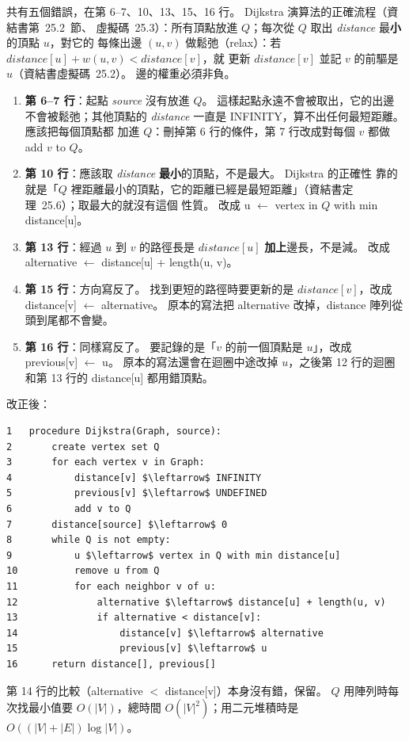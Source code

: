 \begin{pastsoln}
共有五個錯誤，在第 6--7、10、13、15、16 行。 Dijkstra 演算法的正確流程（資結書第~25.2~節、
虛擬碼~25.3）：所有頂點放進 $Q$；每次從 $Q$ 取出 \textit{distance} 最\textbf{小}的頂點 $u$，對它的
每條出邊 $(u, v)$ 做鬆弛（relax）：若 $\mathit{distance}[u] + w(u, v) < \mathit{distance}[v]$，就
更新 $\mathit{distance}[v]$ 並記 $v$ 的前驅是 $u$（資結書虛擬碼~25.2）。 邊的權重必須非負。

\begin{enumerate}
\item \textbf{第 6--7 行}：起點 \textit{source} 沒有放進 $Q$。 這樣起點永遠不會被取出，它的出邊
不會被鬆弛；其他頂點的 \textit{distance} 一直是 INFINITY，算不出任何最短距離。 應該把每個頂點都
加進 $Q$：刪掉第 6 行的條件，第 7 行改成對每個 $v$ 都做 add $v$ to $Q$。
\item \textbf{第 10 行}：應該取 \textit{distance} \textbf{最小}的頂點，不是最大。 Dijkstra 的正確性
靠的就是「$Q$ 裡距離最小的頂點，它的距離已經是最短距離」（資結書定理~25.6）；取最大的就沒有這個
性質。 改成 u $\leftarrow$ vertex in $Q$ with min distance[u]。
\item \textbf{第 13 行}：經過 $u$ 到 $v$ 的路徑長是 $\mathit{distance}[u]$ \textbf{加上}邊長，不是減。
改成 alternative $\leftarrow$ distance[u] + length(u, v)。
\item \textbf{第 15 行}：方向寫反了。 找到更短的路徑時要更新的是 $\mathit{distance}[v]$，改成
distance[v] $\leftarrow$ alternative。 原本的寫法把 alternative 改掉，distance 陣列從頭到尾都不會變。
\item \textbf{第 16 行}：同樣寫反了。 要記錄的是「$v$ 的前一個頂點是 $u$」，改成
previous[v] $\leftarrow$ u。 原本的寫法還會在迴圈中途改掉 $u$，之後第 12 行的迴圈和第 13 行的
distance[u] 都用錯頂點。
\end{enumerate}

改正後：
\begin{lstlisting}[basicstyle=\ttfamily\small, frame=single, columns=fullflexible,
    keepspaces=true, mathescape=true, xleftmargin=3em, xrightmargin=3em]
1   procedure Dijkstra(Graph, source):
2       create vertex set Q
3       for each vertex v in Graph:
4           distance[v] $\leftarrow$ INFINITY
5           previous[v] $\leftarrow$ UNDEFINED
6           add v to Q
7       distance[source] $\leftarrow$ 0
8       while Q is not empty:
9           u $\leftarrow$ vertex in Q with min distance[u]
10          remove u from Q
11          for each neighbor v of u:
12              alternative $\leftarrow$ distance[u] + length(u, v)
13              if alternative < distance[v]:
14                  distance[v] $\leftarrow$ alternative
15                  previous[v] $\leftarrow$ u
16      return distance[], previous[]
\end{lstlisting}
第 14 行的比較（alternative $<$ distance[v]）本身沒有錯，保留。 $Q$ 用陣列時每次找最小值要
$O(|V|)$，總時間 $O(|V|^2)$；用二元堆積時是 $O((|V| + |E|) \log |V|)$。
\end{pastsoln}
